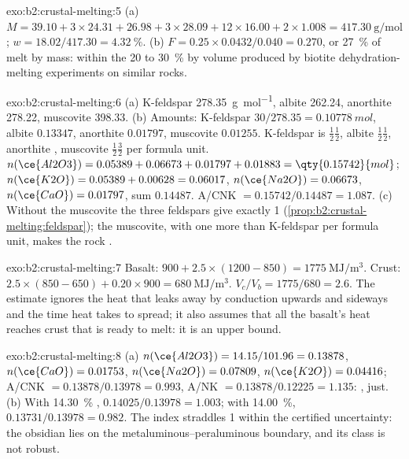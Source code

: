 \begin{solution}{exo:b2:crustal-melting:5}
(a) $M = 39.10 + 3\times24.31 + 26.98 + 3\times28.09 + 12\times16.00 + 2\times1.008 =
\qty{417.30}{\gram\per\mole}$; $w = 18.02/417.30 = \qty{4.32}{\percent}$.
(b) $F = 0.25\times0.0432/0.040 = 0.270$, or \qty{27}{\percent} of melt by mass: within the
20 to \qty{30}{\percent} by volume produced by biotite dehydration-melting experiments on
similar rocks.
\end{solution}

\begin{solution}{exo:b2:crustal-melting:6}
(a) K-feldspar \qty{278.35}{\gram\per\mole}, albite 262.24, anorthite 278.22, muscovite
398.33. (b) Amounts: K-feldspar $30/278.35 = \qty{0.10778}{mol}$, albite $0.13347$,
anorthite $0.01797$, muscovite $0.01255$. K-feldspar is $\tfrac12$$\tfrac12$,
albite $\tfrac12$$\tfrac12$, anorthite , muscovite
$\tfrac12$$\tfrac32$ per formula unit. $n(\ce{Al2O3}) = 0.05389 +
0.06673 + 0.01797 + 0.01883 = \qty{0.15742}{mol}$; $n(\ce{K2O}) = 0.05389 + 0.00628 =
0.06017$, $n(\ce{Na2O}) = 0.06673$, $n(\ce{CaO}) = 0.01797$, sum $0.14487$.
A/CNK $= 0.15742/0.14487 = 1.087$. (c) Without the muscovite the three feldspars give
exactly 1 (\cref{prop:b2:crustal-melting:feldspar}); the muscovite, with one 
more than K-feldspar per formula unit, makes the rock .
\end{solution}

\begin{solution}{exo:b2:crustal-melting:7}
Basalt: $900 + 2.5\times(1200 - 850) = \qty{1775}{\mega\joule\per\cubic\metre}$. Crust:
$2.5\times(850 - 650) + 0.20\times900 = \qty{680}{\mega\joule\per\cubic\metre}$.
$V_c/V_b = 1775/680 = 2.6$. The estimate ignores the heat that leaks away by conduction
upwards and sideways and the time heat takes to spread; it also assumes that all the
basalt's heat reaches crust that is ready to melt: it is an upper bound.
\end{solution}

\begin{solution}{exo:b2:crustal-melting:8}
(a) $n(\ce{Al2O3}) = 14.15/101.96 = 0.13878$, $n(\ce{CaO}) = 0.01753$, $n(\ce{Na2O}) =
0.07809$, $n(\ce{K2O}) = 0.04416$; A/CNK $= 0.13878/0.13978 = 0.993$, A/NK $=
0.13878/0.12225 = 1.135$: , just. (b) With \qty{14.30}{\percent} ,
$0.14025/0.13978 = 1.003$; with \qty{14.00}{\percent}, $0.13731/0.13978 = 0.982$. The index
straddles 1 within the certified uncertainty: the obsidian lies on the
metaluminous--peraluminous boundary, and its class is not robust.
\end{solution}

